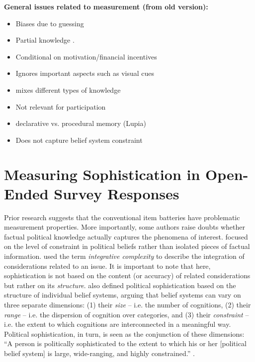 \documentclass[12pt]{article}
\begin{document}
\noindent \textbf{General issues related to measurement (from old version):}
\begin{itemize}\singlespacing
   \item Biases due to guessing \citep[e.g.][]{mondak2004knowledge}
   \item Partial knowledge \citep[e.g.][]{debell2013harder}.
   \item Conditional on motivation/financial incentives \citep[e.g.][]{prior2008money}
   \item Ignores important aspects such as visual cues \citep{prior2014visual}
   \item mixes different types of knowledge \citep{barabas2014question}
   \item Not relevant for participation \citep{lupia2006elitism}
   \item declarative vs. procedural memory (Lupia)
   \item Does not capture belief system constraint \citep{luskin1987measuring,tetlock1983cognitive}
\end{itemize}



\section*{Measuring Sophistication in Open-Ended Survey Responses}

Prior research suggests that the conventional item batteries have problematic measurement properties. More importantly, some authors raise doubts whether factual political knowledge actually captures the phenomena of interest. \citet{converse1964nature} focused on the level of constraint in political beliefs rather than isolated pieces of factual information. \citet{tetlock1983cognitive} used the term \textsl{integrative complexity} to describe the integration of considerations related to an issue. It is important to note that here, sophistication is not based on the content (or accuracy) of related considerations but rather on its \textsl{structure}. \citet{luskin1987measuring} also defined political sophistication based on the structure of individual belief systems, arguing that belief systems can vary on three separate dimensions: (1) their \textsl{size} -- i.e. the number of cognitions, (2) their \textsl{range} -- i.e. the dispersion of cognition over categories, and (3) their \textsl{constraint} -- i.e. the extent to which cognitions are interconnected in a meaningful way. Political sophistication, in turn, is seen as the conjunction of these dimensions: ``A person is politically sophisticated to the extent to which his or her [political belief system] is large, wide-ranging, and highly constrained.'' \citep[860]{luskin1987measuring}.
\end{document}
